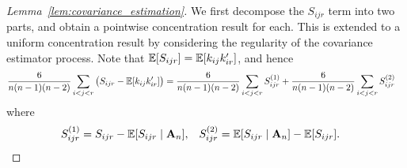 \begin{proof}[Lemma~\ref{lem:covariance_estimation}]
  We first decompose the $S_{ijr}$ term into two parts,
  and obtain a pointwise concentration result for each.
  This is extended to a uniform concentration result
  by considering the regularity of the covariance estimator process.
  Note that
  $\mathbb{E}[S_{ijr}] = \mathbb{E}[k_{ij} k_{ir}']$,
  and hence
  \begin{align*}
    \frac{6}{n(n-1)(n-2)}
    \sum_{i<j<r}
    \big(
    S_{ijr}
    - \mathbb{E}[k_{ij} k_{ir}']
    \big)
    &=
    \frac{6}{n(n-1)(n-2)}
    \sum_{i<j<r}
    S_{ijr}^{(1)}
    + \frac{6}{n(n-1)(n-2)}
    \sum_{i<j<r}
    S_{ijr}^{(2)}
  \end{align*}
  where
  \begin{align*}
    S_{ijr}^{(1)}
    &=
    S_{ijr} -
    \mathbb{E}[S_{ijr} \mid \mathbf{A}_n],
    &S_{ijr}^{(2)}
    &=
    \mathbb{E}[S_{ijr} \mid \mathbf{A}_n]
    - \mathbb{E}[S_{ijr}].
  \end{align*}



\end{proof}
